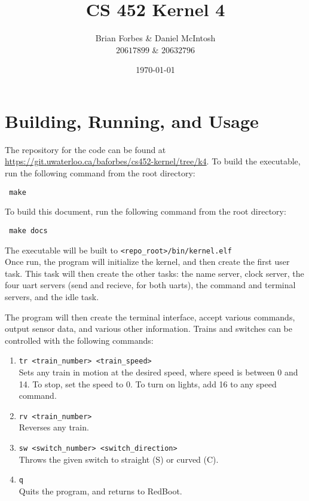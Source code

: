 \documentclass{article}
\begin{document}
\title{CS 452 Kernel 4}
\author{Brian Forbes \& Daniel McIntosh \\ $20617899$ \& $20632796$}
\date{\today}

\maketitle

\section{Building, Running, and Usage}

The repository for the code can be found at \url{https://git.uwaterloo.ca/baforbes/cs452-kernel/tree/k4}.
To build the executable, run the following command from the root directory: \begin{verbatim} make \end{verbatim}
To build this document, run the following command from the root directory: \begin{verbatim} make docs \end{verbatim}
The executable will be built to \verb|<repo_root>/bin/kernel.elf|\\

Once run, the program will initialize the kernel, and then create the first user task. This task will then create the other tasks: the name server, clock server, the four uart servers (send and recieve, for both uarts), the command and terminal servers, and the idle task.

The program will then create the terminal interface, accept various commands, output sensor data, and various other information. Trains and switches can be controlled with the following commands:

\begin{enumerate}
\item \verb|tr <train_number> <train_speed>|\\
    Sets any train in motion at the desired speed, where speed is between 0 and 14. To stop, set the speed to 0. To turn on lights, add 16 to any speed command.
\item \verb|rv <train_number>|\\
    Reverses any train.
\item \verb|sw <switch_number> <switch_direction>|\\
    Throws the given switch to straight (S) or curved (C).
\item \verb|q|\\
    Quits the program, and returns to RedBoot.
\end{enumerate}
\end{document}

